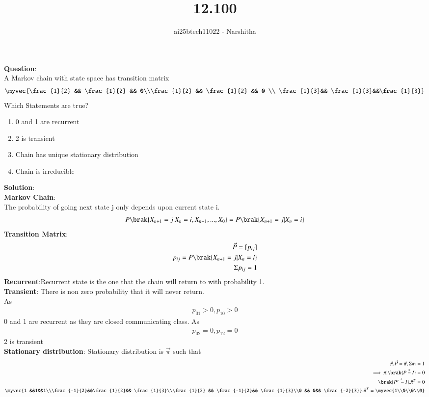 \documentclass[journal,12pt,onecolumn]{IEEEtran}
\theoremstyle{remark}
\begin{document}
\title{12.100}
\author{ai25btech11022 - Narshitha}
\maketitle
\renewcommand{\thefigure}{\theenumi}
\renewcommand{\thetable}{\theenumi}
\textbf{Question}:\\
A Markov chain with state space  has transition matrix \\
\begin{align}
    \myvec{\frac{1}{2} && \frac{1}{2} && 0\\\frac{1}{2} && \frac{1}{2} && 0 \\ \frac{1}{3}&& \frac{1}{3}&&\frac{1}{3}}
\end{align}
Which Statements are true?
\begin{enumerate}
    \item 0 and 1 are recurrent
    \item 2 is transient
    \item Chain has unique stationary distribution
    \item Chain is irreducible
\end{enumerate}
\textbf{Solution}:\\
\textbf{Markov Chain}:\\
The probability of going next state j  only depends upon current state i.
\begin{align}
    P\brak{X_{n+1} =j|X_n=i,X_{n-1},...,X_0}=P\brak{X_{n+1} =j|X_n=i}
\end{align}
\textbf{Transition Matrix}:
\begin{align}
\vec{P}=[ p_{ij}]\\
p_{ij}=P\brak{X_{n+1}=j|X_n =i}\\
\Sigma p_{ij} =1
\end{align}
\textbf{Recurrent}:Recurrent state is the one that the chain will return to with probability 1.\\
\textbf{Transient}: There is non zero probability that it will never return.\\
As \begin{align}
    p_{01} >0 ,p_{10}>0
\end{align} 0 and 1 are recurrent as they are closed communicating class.
As
\begin{align}
    p_{02}=0,p_{12}=0
\end{align} 2 is transient\\
\textbf{Stationary distribution}: Stationary distribution  is $\vec{\pi}$ such that
\begin{align}
    \vec{\pi}.\vec{P}=\vec{\pi} ,\Sigma \pi_i=1\\
    \implies  \vec{\pi}.\brak{\vec{P-I}}=0\\
    \brak{\vec{P^T-I}}.\vec{\pi}^T =0\\
    \myvec{1 &&1&&1\\\frac{-1}{2}&&\frac{1}{2}&& \frac{1}{3}\\\frac{1}{2} && \frac{-1}{2}&& \frac{1}{3}\\0 && 0&& \frac{-2}{3}}.\vec{\pi}^T =\myvec{1\\0\\0\\0}
\end{align}
\end{document}
